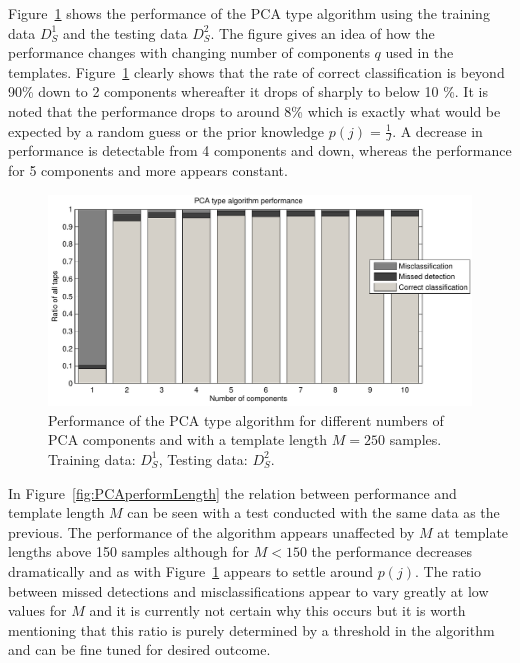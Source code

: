 Figure~\ref{fig:PCAperform} shows the performance of the PCA type algorithm using the training data $D^1_S$ and the testing data $D^2_S$. The figure gives an idea of how the performance changes with changing number of components $q$ used in the templates. Figure~\ref{fig:PCAperform} clearly shows that the rate of correct classification is beyond 90\% down to 2 components whereafter it drops of sharply to below 10 \%. It is noted that the performance drops to around 8\% which is exactly what would be expected by a random guess or the prior knowledge $p(j)= \frac{1}{J}$. A decrease in performance is detectable from 4 components and down, whereas the performance for 5 components and more appears constant.

\begin{figure}[!] %
\centering
\includegraphics[width=150mm]{PCAperform.pdf}
\caption{Performance of the PCA type algorithm for different numbers of PCA components and with a template length $M=250$ samples. Training data: $D^1_S$, Testing data: $D^2_S$.}\label{fig:PCAperform}
\end{figure}

In Figure~\ref{fig:PCAperformLength} the relation between performance and template length $M$ can be seen with a test conducted with the same data as the previous. The performance of the algorithm appears unaffected by $M$ at template lengths above 150 samples although for $M<150$ the performance decreases dramatically and as with Figure~\ref{fig:PCAperform} appears to settle around $p(j)$. The ratio between missed detections and misclassifications appear to vary greatly at low values for $M$ and it is currently not certain why this occurs but it is worth mentioning that this ratio is purely determined by a threshold in the algorithm and can be fine tuned for desired outcome.

